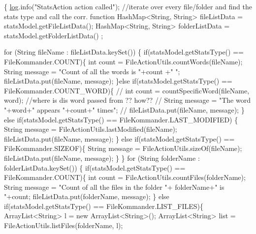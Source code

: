 \begin{DoxyCode}
                                                                        \{
        \hyperlink{classcom_1_1poly_1_1nlp_1_1filekommander_1_1file_1_1actions_1_1_call_action_a65b722d9482bd93c3ae2b31f51050a08}{log}.info(\textcolor{stringliteral}{"StatsAction action called"}); 
        \textcolor{comment}{//iterate over every file/folder and find the stats type and call the
       corr. function }
        HashMap<String, String> fileListData = statsModel.getFileListData();
        HashMap<String, String> folderListData = statsModel.getFolderListData()
      ;

        \textcolor{keywordflow}{for} (String fileName : fileListData.keySet()) \{
            \textcolor{keywordflow}{if}(statsModel.getStatsType() == FileKommander.COUNT)\{
                \textcolor{keywordtype}{int} count = FileActionUtils.countWords(fileName);
                String message = \textcolor{stringliteral}{"Count of all the words is "}+count +\textcolor{stringliteral}{" "};
                fileListData.put(fileName, message);
            \}\textcolor{keywordflow}{else} \textcolor{keywordflow}{if}(statsModel.getStatsType() == FileKommander.COUNT\_WORD)\{
        \textcolor{comment}{//      int count = countSpecificWord(fileName, word); //where is dis
       word passed from ?? how??}
        \textcolor{comment}{//      String message = "The word "+word+" appears "+count+" times";}
        \textcolor{comment}{//      fileListData.put(fileName, message);}
            \} \textcolor{keywordflow}{else} \textcolor{keywordflow}{if}(statsModel.getStatsType() == FileKommander.LAST\_MODIFIED)
      \{
                String message = FileActionUtils.lastModified(fileName);
                fileListData.put(fileName, message);
            \} \textcolor{keywordflow}{else} \textcolor{keywordflow}{if}(statsModel.getStatsType() == FileKommander.SIZEOF)\{
                String message = FileActionUtils.sizeOf(fileName);
                fileListData.put(fileName, message);
            \}
        \}
        \textcolor{keywordflow}{for} (String folderName : folderListData.keySet()) \{
            \textcolor{keywordflow}{if}(statsModel.getStatsType() == FileKommander.COUNT)\{
                \textcolor{keywordtype}{int} count = FileActionUtils.countFiles(folderName);
                String message = \textcolor{stringliteral}{"Count of all the files in the folder "}+
      folderName+\textcolor{stringliteral}{" is "}+count;
                fileListData.put(folderName, message);
            \} \textcolor{keywordflow}{else} \textcolor{keywordflow}{if}(statsModel.getStatsType() == FileKommander.LIST\_FILES)\{
                ArrayList<String> l = \textcolor{keyword}{new} ArrayList<String>();
                ArrayList<String> list = FileActionUtils.listFiles(folderName, 
      l);
            

\end{DoxyCode}
